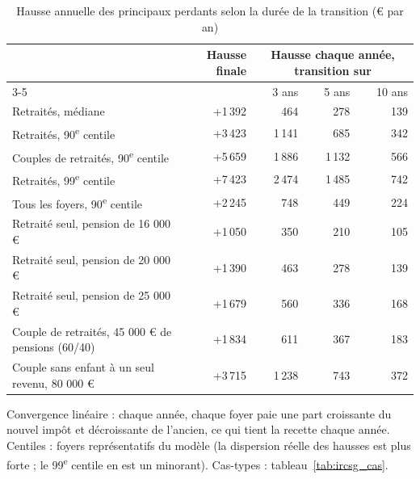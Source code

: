 \begin{table}[!htbp]\centering\scriptsize\setlength{\tabcolsep}{4pt}
\caption{Hausse annuelle des principaux perdants selon la durée de la transition (€ par an)}\label{tab:ircsg_trans}
\begin{tabular}{@{}lrrrr@{}}
\toprule
& Hausse finale & \multicolumn{3}{c}{Hausse chaque année, transition sur} \\ \cmidrule(l){3-5}
& & 3 ans & 5 ans & 10 ans \\
\midrule
Retraités, médiane & +1\,392 & 464 & 278 & 139 \\
Retraités, 90\textsuperscript{e} centile & +3\,423 & 1\,141 & 685 & 342 \\
Couples de retraités, 90\textsuperscript{e} centile & +5\,659 & 1\,886 & 1\,132 & 566 \\
Retraités, 99\textsuperscript{e} centile & +7\,423 & 2\,474 & 1\,485 & 742 \\
Tous les foyers, 90\textsuperscript{e} centile & +2\,245 & 748 & 449 & 224 \\
Retraité seul, pension de 16 000 € & +1\,050 & 350 & 210 & 105 \\
Retraité seul, pension de 20 000 € & +1\,390 & 463 & 278 & 139 \\
Retraité seul, pension de 25 000 € & +1\,679 & 560 & 336 & 168 \\
Couple de retraités, 45 000 € de pensions (60/40) & +1\,834 & 611 & 367 & 183 \\
Couple sans enfant à un seul revenu, 80 000 € & +3\,715 & 1\,238 & 743 & 372 \\
\bottomrule
\end{tabular}
\par\vspace{3pt}\parbox{\linewidth}{\raggedright\scriptsize\color{encre}
Convergence linéaire : chaque année, chaque foyer paie une part croissante du nouvel impôt et décroissante de l'ancien, ce qui tient la recette chaque année. Centiles : foyers représentatifs du modèle (la dispersion réelle des hausses est plus forte ; le 99\textsuperscript{e} centile en est un minorant). Cas-types : tableau~\ref{tab:ircsg_cas}.}
\end{table}
